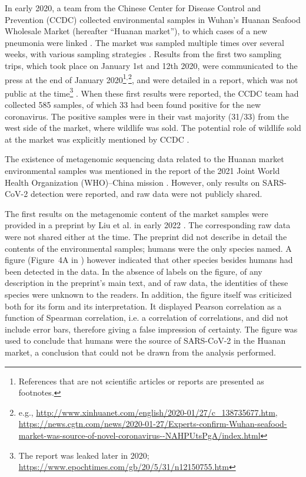 \documentclass[11pt]{article}
\def \sct {\mbox{SARS-CoV-2}}
\begin{document}
In early 2020, a team from the Chinese Center for Disease Control and Prevention (CCDC) collected environmental samples in Wuhan’s Huanan Seafood Wholesale Market (hereafter ``Huanan market''), to which cases of a new pneumonia were linked \citep{Chen2020Lancet, Worobey2021Science}. The market was sampled multiple times over several weeks, with various sampling strategies \citep{WHO2021}. Results from the first two sampling trips, which took place on January 1st and 12th 2020, were communicated to the press at the end of January 2020\footnote{References that are not scientific articles or reports are presented as footnotes.}$^,$\footnote{e.g., \url{http://www.xinhuanet.com/english/2020-01/27/c_138735677.htm}, \url{https://news.cgtn.com/news/2020-01-27/Experts-confirm-Wuhan-seafood-market-was-source-of-novel-coronavirus--NAHPUtsPgA/index.html}}, and were detailed in a report, which was not public at the time\footnote{The report was leaked later in 2020; \url{https://www.epochtimes.com/gb/20/5/31/n12150755.htm}} \citep{Wu2020CCDC}. When these first results were reported, the CCDC team had collected 585 samples, of which 33 had been found positive for the new coronavirus. The positive samples were in their vast majority (31/33) from the west side of the market, where wildlife was sold. The potential role of wildlife sold at the market was explicitly mentioned by CCDC \citep{Wu2020CCDC, Tan2020CCDC}. 

The existence of metagenomic sequencing data related to the Huanan market environmental samples was mentioned in the report of the 2021 Joint World Health Organization (WHO)--China mission \citep[p.97]{WHO2021}.  However, only results on \sct{} detection were reported, and raw data were not publicly shared. 

The first results on the metagenomic content of the market samples were provided in a preprint by Liu et al. in early 2022 \citep{Liu2022RS}. The corresponding raw data were not shared either at the time. The preprint did not describe in detail the contents of the environmental samples; humans were the only species named. A figure (Figure~4A in \citet{Liu2022RS}) however indicated that other species besides humans had been detected in the data. In the absence of labels on the figure, of any description in the preprint's main text, and of raw data, the identities of these species were unknown to the readers. In addition, the figure itself was criticized both for its form and its interpretation. It displayed Pearson correlation as a function of Spearman correlation, i.e. a correlation of correlations, and did not include error bars, therefore giving a false impression of certainty. The figure was used to conclude that humans were the source of \sct{} in the Huanan market, a conclusion that could not be drawn from the analysis performed. 
\end{document}
